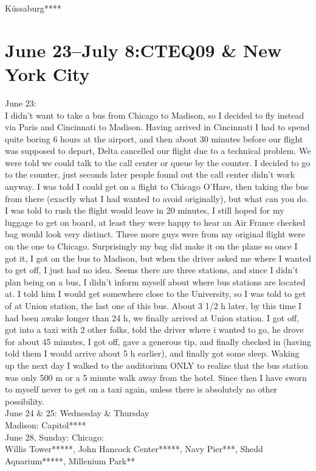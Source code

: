 K\"ussaburg****

\section{June 23--July 8:CTEQ09 \& New York City}
\label{2009:US}

June 23:\\
I didn't want to take a bus from Chicago to Madison, so I decided to fly instead via Paris and Cincinnati to Madison. Having arrived in Cincinnati I had to spend quite boring 6 hours at the airport, and then about 30 minutes before our flight was supposed to depart, Delta cancelled our flight due to a technical problem. We were told we could talk to the call center or queue by the counter. I decided to go to the counter, just seconds later people found out the call center didn't work anyway. I was told I could get on a flight to Chicago O'Hare, then taking the bus from there (exactly what I had wanted to avoid originally), but what can you do. I was told to rush the flight would leave in 20 minutes, I still hoped for my luggage to get on board, at least they were happy to hear an Air France checked bag would look very distinct. Three more guys were from my original flight were on the one to Chicago. Surprisingly my bag did make it on the plane so once I got it, I got on the bus to Madison, but when the driver asked me where I wanted to get off, I just had no idea. Seems there are three stations, and since I didn't plan being on a bus, I didn't inform myself about where bus stations are located at. I told him I would get somewhere close to the University, so I was told to get of at Union station, the last one of this bus. About 3 1/2 h later, by this time I had been awake longer than 24 h, we finally arrived at Union station. I got off, got into a taxi with 2 other folks, told the driver where i wanted to go, he drove for about 45 minutes, I got off, gave a generous tip, and finally checked in (having told them I would arrive about 5 h earlier), and finally got some sleep. Waking up the next day I walked to the auditorium ONLY to realize that the bus station was only 500 m or a 5 minute walk away from the hotel. Since then I have sworn to myself never to get on a taxi again, unless there is absolutely no other possibility.\\

June 24 \& 25: Wednesday \& Thursday\\
Madison: Capitol****\\

June 28, Sunday: Chicago:\\
Willis Tower*****, John Hancock Center*****, Navy Pier***, Shedd Aquarium*****, Millenium Park**\\

